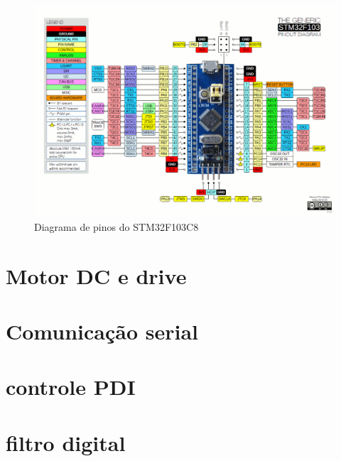 \begin{figure}[h]
	\centering
	\includegraphics[width=1.0\textwidth]{figures/stm32f1_pinout}
	\caption{Diagrama de pinos do STM32F103C8}
\end{figure}



\section{Motor DC e drive}


\section{Comunicação serial}


\section{controle PDI}


\section{filtro digital}




